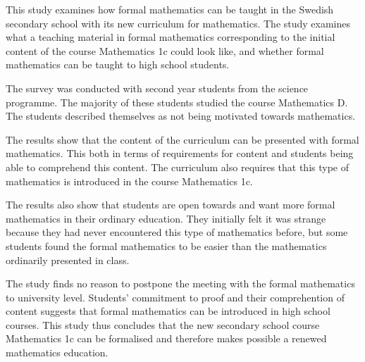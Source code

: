 \noindent
This study examines how formal mathematics can be taught in the Swedish 
secondary school with its new curriculum for mathematics. 
The study examines what a teaching material in formal mathematics 
corresponding to the initial content of the course Mathematics 1c could look
like, and whether formal mathematics can be taught to high school students. 

The survey was conducted with second year students from the science programme.
The majority of these students studied the course Mathematics D. 
The students described themselves as not being motivated towards mathematics.

The results show that the content of the curriculum can be presented with
formal mathematics. 
This both in terms of requirements for content and students being able to
comprehend this content.
The curriculum also requires that this type of mathematics is introduced in
the course Mathematics 1c.

The results also show that students are open towards and want more formal
mathematics in their ordinary education. 
They initially felt it was strange because they had never encountered this 
type of mathematics before, but
some students found the formal mathematics to be easier than the
mathematics ordinarily presented in class.

The study finds no reason to postpone the meeting with the formal mathematics 
to university level. 
Students' commitment to proof and their comprehention of content suggests that
formal mathematics can be introduced in high school courses. 
This study thus concludes that the new secondary school course Mathematics 1c
can be formalised and therefore makes possible a renewed mathematics education.
